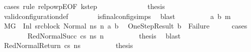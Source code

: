 \begin{isabellebody}
\ {\isacharparenleft}{\kern0pt}cases\ rule{\isacharcolon}{\kern0pt}\ relpowp{\isacharunderscore}{\kern0pt}E{}{\isacharunderscore}{\kern0pt}{}{\isacharbrackleft}{\kern0pt}OF\ k{\isacharunderscore}{\kern0pt}step{\isacharbrackright}{\kern0pt}{\isacharparenright}{\kern0pt}\isanewline
\ \ \ \ \isamarkupfalse%
\ {}\isanewline
\ \ \ \ \isamarkupfalse%
\ \isamarkupfalse%
\ {\isacharquery}{\kern0pt}thesis\isanewline
\ \ \ \ \ \ \isamarkupfalse%
\ valid{\isacharunderscore}{\kern0pt}configuration{\isacharunderscore}{\kern0pt}def\isanewline
\ \ \ \ \ \ \isamarkupfalse%
\ is{\isacharunderscore}{\kern0pt}final{\isacharunderscore}{\kern0pt}config{\isachardot}{\kern0pt}simps{\isacharparenleft}{\kern0pt}{}{\isacharparenright}{\kern0pt}\ \isamarkupfalse%
\ blast\isanewline
\ \ \isamarkupfalse%
\isanewline
\ \ \ \ \isamarkupfalse%
\ {\isacharparenleft}{\kern0pt}{}\ a\ b\ m{\isacharparenright}{\kern0pt}\isanewline
\ \ \ \ \isamarkupfalse%
\ {\isacartoucheopen}M{\isacharcomma}{\kern0pt}{\isasymLambda}{\isacharcomma}{\kern0pt}{\isasymGamma}{\isacharcomma}{\kern0pt}{\isasymOmega}{\isacharcomma}{\kern0pt}G\ {\isasymturnstile}\ {\isacharparenleft}{\kern0pt}Inl\ src{\isacharunderscore}{\kern0pt}block{\isacharcomma}{\kern0pt}\ Normal\ ns{\isacharparenright}{\kern0pt}\ {\isacharminus}{\kern0pt}n{\isasymrightarrow}\ {\isacharparenleft}{\kern0pt}a{\isacharcomma}{\kern0pt}\ b{\isacharparenright}{\kern0pt}{\isacartoucheclose}\ \isamarkupfalse%
\ OneStepResult{\isacharcolon}{\kern0pt}\ {\isachardoublequoteopen}b\ {\isasymnoteq}\ Failure{\isachardoublequoteclose}\isanewline
\ \ \ \ \isamarkupfalse%
\ cases\isanewline
\ \ \ \ \ \ \isamarkupfalse%
\ {\isacharparenleft}{\kern0pt}RedNormalSucc\ cs\ ns{\isacharprime}{\kern0pt}\ n{\isacharprime}{\kern0pt}{\isacharparenright}{\kern0pt}\isanewline
\ \ \ \ \ \ \isamarkupfalse%
\ \isamarkupfalse%
\ {\isacharquery}{\kern0pt}thesis\ \isamarkupfalse%
\ blast\isanewline
\ \ \ \ \isamarkupfalse%
\isanewline
\ \ \ \ \ \ \isamarkupfalse%
\ {\isacharparenleft}{\kern0pt}RedNormalReturn\ cs\ ns{\isacharprime}{\kern0pt}{\isacharparenright}{\kern0pt}\isanewline
\ \ \ \ \ \ \isamarkupfalse%
\ \isamarkupfalse%
\ {\isacharquery}{\kern0pt}thesis\ \isamarkupfalse%

\end{isabellebody}
